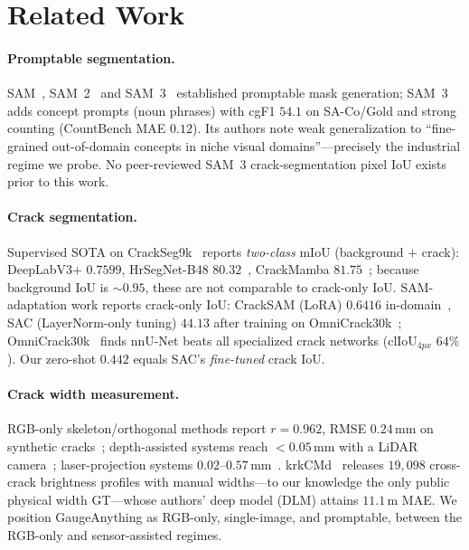 \documentclass[11pt]{article}
\newcommand{\ours}{GaugeAnything}
\newcommand{\um}{\,\textmu m}
\begin{document}
\section{Related Work}\label{sec:related}

\paragraph{Promptable segmentation.} SAM~\citep{kirillov2023sam}, SAM~2~\citep{ravi2024sam2}
and SAM~3~\citep{sam3_2025} established promptable mask generation; SAM~3 adds concept
prompts (noun phrases) with cgF1 $54.1$ on SA-Co/Gold and strong counting (CountBench MAE
$0.12$). Its authors note weak generalization to ``fine-grained out-of-domain concepts in
niche visual domains''---precisely the industrial regime we probe. No peer-reviewed SAM~3
crack-segmentation pixel IoU exists prior to this work.

\paragraph{Crack segmentation.} Supervised SOTA on CrackSeg9k~\citep{kulkarni2022crackseg9k}
reports \emph{two-class} mIoU (background $+$ crack): DeepLabV3+ $0.7599$, HrSegNet-B48
$80.32$~\citep{li2023hrsegnet}, CrackMamba $81.75$~\citep{zuo2024crackmamba}; because
background IoU is ${\sim}0.95$, these are not comparable to crack-only IoU. SAM-adaptation
work reports crack-only IoU: CrackSAM (LoRA) $0.6416$ in-domain~\citep{ge2024cracksam}, SAC
(LayerNorm-only tuning) $44.13$ after training on OmniCrack30k~\citep{rostami2025sac};
OmniCrack30k~\citep{benz2024omnicrack} finds nnU-Net beats all specialized crack networks
(clIoU$_{4px}$ $64\%$). Our zero-shot $0.442$ equals SAC's \emph{fine-tuned} crack IoU.

\paragraph{Crack width measurement.} RGB-only skeleton/orthogonal methods report
$r{=}0.962$, RMSE $0.24$\,mm on synthetic cracks~\citep{neighborhood2025}; depth-assisted
systems reach $<0.05$\,mm with a LiDAR camera~\citep{rgbd2025}; laser-projection systems
$0.02$--$0.57$\,mm~\citep{laserbeam2023}. krkCMd~\citep{krkcmd2025} releases $19{,}098$
cross-crack brightness profiles with manual widths---to our knowledge the only public
physical width GT---whose authors' deep model (DLM) attains $11.1$\um{} MAE. We position
\ours{} as RGB-only, single-image, and promptable, between the RGB-only and sensor-assisted
regimes.
\end{document}
